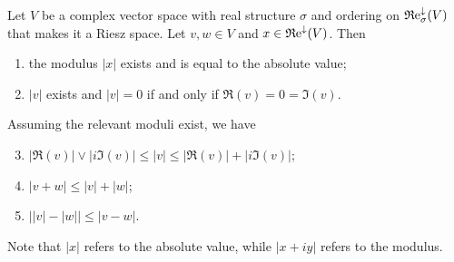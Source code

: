 \begin{lemma} \label{modulusTriangleInequalities}
Let $V$ be a complex vector space with real structure $\sigma$ and ordering on $\operatorname{\mathfrak{R}e}^\downarrow_\sigma(V)$ that makes it a Riesz space. Let $v,w \in V$ and $x\in \operatorname{\mathfrak{R}e}^\downarrow(V)$. Then
\begin{enumerate}
\item the modulus $|x|$ exists and is equal to the absolute value;
\item $|v|$ exists and $|v| = 0$ \textup{if and only if} $\Re(v) = 0 = \Im(v)$.
\end{enumerate}
Assuming the relevant moduli exist, we have
\begin{enumerate} \setcounter{enumi}{2}
\item $|\Re(v)| \vee |i\Im(v)| \leq |v| \leq |\Re(v)| + |i\Im(v)|$;
\item $|v + w| \leq |v| + |w|$;
\item $\big||v| - |w|\big| \leq |v - w|$.
\end{enumerate}
\end{lemma}
Note that $|x|$ refers to the absolute value, while $|x+iy|$ refers to the modulus.
